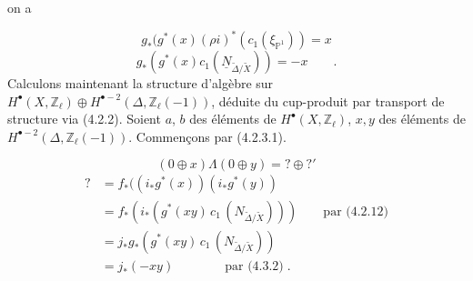 \begin{center}
\end{center}
on a

\begin{equation}\tag{4.3.1}
g_*(g^*(x) (\rho i)^*(c_1(\xi_{\mathbb{P}^1})) = x
\end{equation}
\begin{equation}\tag{4.3.2}
g_*(g^*(x) c_1(\underline{N}_{\widetilde{\Delta}/\widetilde{X}})) = - x \qquad .
\end{equation}
Calculons maintenant la structure d'algèbre sur $H^{\bullet}(X,\mathbb{Z}_{\ell}) \oplus H^{\bullet-2}(\Delta, \mathbb{Z}_{\ell}(-1))$, déduite du cup-produit par transport de structure via (4.2.2). Soient $a$, $b$ des éléments de $H^{\bullet}(X,\mathbb{Z}_{\ell})$, $x,y$ des éléments de $H^{\bullet-2}(\Delta,\mathbb{Z}_{\ell}(-1))$. Commençons par (4.2.3.1).

\begin{equation*}
(0 \oplus x) \Lambda (0 \oplus y) = ? \oplus ?'
\end{equation*}
\begin{equation*}
\begin{aligned}
? &= f_*((i_*g^*(x))(i_*g^*(y)) \\
&= f_*(i_*(g^*(xy)\, c_1\, (N_{\widetilde{\Delta}/\widetilde{X}}))) \qquad \text{par (4.2.12)} \\
&= j_*g_*(g^*(xy)\, c_1\, (N_{\widetilde{\Delta}/\widetilde{X}})) \\
&= j_*(-xy) \qquad\qquad \text{par (4.3.2)} \;.
\end{aligned}
\end{equation*}

